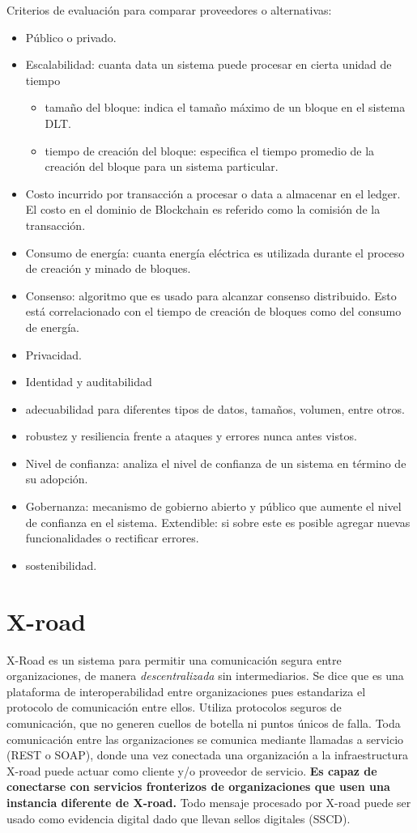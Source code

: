 Criterios de evaluación para comparar proveedores o alternativas:
\begin{itemize}
    \item Público o privado. 
    \item Escalabilidad: cuanta data un sistema puede procesar en cierta unidad de tiempo
    \begin{itemize}
        \item tamaño del bloque: indica el tamaño máximo de un bloque en el sistema DLT.
        \item tiempo de creación del bloque: especifica el tiempo promedio de la creación del bloque para un sistema particular. 
    \end{itemize}
    \item Costo incurrido por transacción a procesar o data a almacenar en el ledger. El costo en el dominio de Blockchain es referido como la comisión de la transacción.
    \item Consumo de energía: cuanta energía eléctrica es utilizada durante el proceso de creación y minado de bloques. 
    \item Consenso: algoritmo que es usado para alcanzar consenso distribuido. Esto está correlacionado con el tiempo de creación de bloques como del consumo de energía.  
    \item Privacidad.
    \item Identidad y auditabilidad
    \item adecuabilidad para diferentes tipos de datos, tamaños, volumen, entre otros.
    \item robustez y resiliencia frente a ataques y errores nunca antes vistos.
    \item Nivel de confianza: analiza el nivel de confianza de un sistema en término de su adopción.
    \item Gobernanza: mecanismo de gobierno abierto y público que aumente el nivel de confianza en el sistema.
    Extendible: si sobre este es posible agregar nuevas funcionalidades o rectificar errores. 
    \item sostenibilidad. 
\end{itemize}

\section{X-road}
X-Road es un sistema para permitir una comunicación segura entre organizaciones, de manera \textit{descentralizada} sin intermediarios. Se dice que es una plataforma de interoperabilidad entre organizaciones pues estandariza el protocolo de comunicación entre ellos. Utiliza protocolos seguros de comunicación, que no generen cuellos de botella ni  puntos únicos de falla. Toda comunicación entre las organizaciones se comunica mediante llamadas a servicio (REST o SOAP), donde una vez conectada una organización a la infraestructura X-road puede actuar como cliente y/o proveedor de servicio. \textbf{Es capaz de conectarse con servicios fronterizos de organizaciones que usen una instancia diferente de X-road.} Todo mensaje procesado por X-road puede ser usado como evidencia digital dado que llevan sellos digitales (SSCD).


